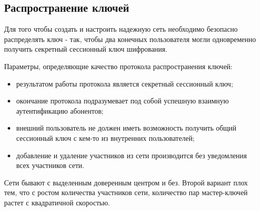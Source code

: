 \documentclass[a4paper]{article}
\begin{document}
\subsection{Распространение ключей}
Для того чтобы создать и настроить надежную сеть необходимо безопасно распределять ключ - так, чтобы два конечных пользователя могли одновременно получить секретный сессионный ключ шифрования. 
\par
Параметры, определяющие качество протокола распространения ключей:
\begin{itemize}
    \item результатом работы протокола является секретный сессионный ключ;
    \item окончание протокола подразумевает под собой успешную взаимную аутентификацию абонентов;
    \item внешний пользователь не должен иметь возможность получить общий сессионный ключ с кем-то из внутренних пользователей;
    \item добавление и удаление участников из сети производится без уведомления всех участников сети.
\end{itemize}
Сети бывают с выделенным доверенным центром и без. Второй вариант плох тем, что с ростом количества участников сети, количество пар мастер-ключей растет с квадратичной скоростью.
\end{document}
